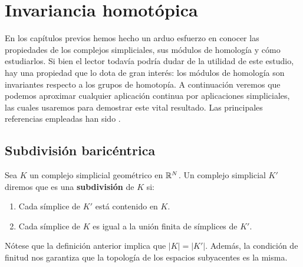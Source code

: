 
\chapter{Invariancia homotópica}

En los capítulos previos hemos hecho un arduo esfuerzo en conocer las propiedades de los complejos simpliciales, sus módulos de homología y cómo estudiarlos. Si bien el lector todavía podría dudar de la utilidad de este estudio, hay una propiedad que lo dota de gran interés: los módulos de homología son invariantes respecto a los grupos de homotopía. A continuación veremos que podemos aproximar cualquier aplicación continua por aplicaciones simpliciales, las cuales usaremos para demostrar este vital resultado. Las principales referencias empleadas han sido \cite{rafael2003elementos} \cite{Armstrong1983}.

\section{Subdivisión baricéntrica}

\begin{definicion}
	Sea $K$ un complejo simplicial geométrico en $\mathbb{R}^N$. Un complejo simplicial $K'$ diremos que es una \textbf{subdivisión} de $K$ si:
	\begin{enumerate}
		\item Cada símplice de $K'$ está contenido en $K$.
		\item Cada símplice de $K$ es igual a la unión finita de símplices de $K'$.
	\end{enumerate} 
\end{definicion}
\begin{observacion}
Nótese que la definición anterior implica que $|K|=|K'|$. Además, la condición de finitud nos garantiza que la topología de los espacios subyacentes es la misma.
\end{observacion}

